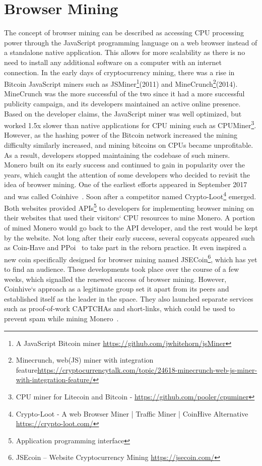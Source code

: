 \section{Browser Mining}
The concept of browser mining can be described as accessing CPU processing power through the JavaScript programming language on a web browser instead of a standalone native application. This allows for more scalability as there is no need to install any additional software on a computer with an internet connection. In the early days of cryptocurrency mining, there was a rise in Bitcoin JavaScript miners such as JSMiner\footnote{A JavaScript Bitcoin miner \url{https://github.com/jwhitehorn/jsMiner}}(2011) and MineCrunch\footnote{Minecrunch, web(JS) miner with integration feature\url{https://cryptocurrencytalk.com/topic/24618-minecrunch-web-js-miner-with-integration-feature/}}(2014). MineCrunch was the more successful of the two since it had a more successful publicity campaign, and its developers maintained an active online presence. Based on the developer claims, the JavaScript miner was well optimized, but worked 1.5x slower than native applications for CPU mining such as CPUMiner\footnote{CPU miner for Litecoin and Bitcoin - \url{https://github.com/pooler/cpuminer}}. However, as the hashing power of the Bitcoin network increased the mining difficulty similarly increased, and mining bitcoins on CPUs became unprofitable. As a result, developers stopped maintaining the codebase of such miners.
\\
Monero built on its early success and continued to gain in popularity over the years, which caught the attention of some developers who decided to revisit the idea of browser mining. One of the earliest efforts appeared in September 2017 and was called Coinhive~\cite{coinhive}. Soon after a competitor named Crypto-Loot\footnote{Crypto-Loot - A web Browser Miner | Traffic Miner | CoinHive Alternative \url{https://crypto-loot.com/}} emerged. Both websites provided APIs\footnote{Application programming interface} to developers for implementing browser mining on their websites that used their visitors` CPU resources to mine Monero. A portion of mined Monero would go back to the API developer, and the rest would be kept by the website. Not long after their early success, several copycats appeared such as Coin-Have and PPoi~\cite{coinhivecopycats} to take part in the reborn practice. It even inspired a new coin specifically designed for browser mining named JSECoin\footnote{JSEcoin – Website Cryptocurrency Mining \url{https://jsecoin.com/}}, which has yet to find an audience. These developments took place over the course of a few weeks, which signalled the renewed success of browser mining. However, Coinhive`s approach as a legitimate group set it apart from its peers and established itself as the leader in the space. They also launched separate services such as proof-of-work CAPTCHAs and short-links, which could be used to prevent spam while mining Monero~\cite{coinhive}.

